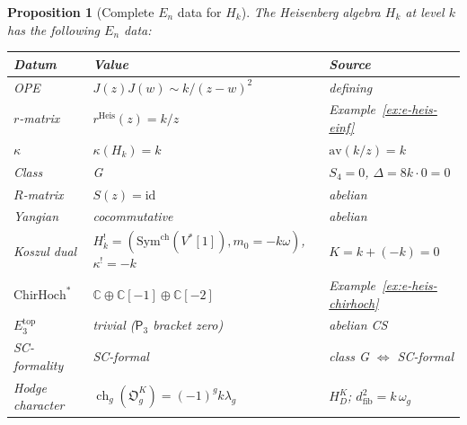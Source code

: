 \documentclass[11pt,reqno]{amsart}
\newtheorem{proposition}[theorem]{Proposition}
\theoremstyle{definition}
\theoremstyle{remark}
\providecommand{\Ethree}{E_3}
\providecommand{\En}{E_n}
\providecommand{\Pthree}{\mathsf{P}_3}
\providecommand{\ChirHoch}{\mathrm{ChirHoch}}
\providecommand{\bC}{\mathbb{C}}
\providecommand{\id}{\mathrm{id}}
\providecommand{\Sym}{\mathrm{Sym}}
\begin{document}
\begin{proposition}[Complete $\En$ data for $H_k$]
\label{prop:e-heis-complete}
The Heisenberg algebra $H_k$ at level $k$ has the following
$\En$ data:
\begin{center}
\renewcommand{\arraystretch}{1.15}
\begin{tabular}{lll}
\textbf{Datum} & \textbf{Value} & \textbf{Source} \\
\hline
\textup{OPE} & $J(z)J(w) \sim k/(z-w)^2$ & defining \\
\textup{$r$-matrix} & $r^{\mathrm{Heis}}(z) = k/z$ &
 Example~\ref{ex:e-heis-einf} \\
\textup{$\kappa$} & $\kappa(H_k) = k$ &
 $\mathrm{av}(k/z) = k$ \\
\textup{Class} & G &
 $S_4 = 0$, $\Delta = 8k \cdot 0 = 0$ \\
\textup{$R$-matrix} & $S(z) = \id$ & abelian \\
\textup{Yangian} & cocommutative & abelian \\
\textup{Koszul dual} & $H_k^!=(\Sym^{\mathrm{ch}}(V^*[1]),m_0=-k\omega)$,
 $\kappa^! = -k$ & $K = k + (-k) = 0$ \\
\textup{$\ChirHoch^*$} & $\bC \oplus \bC[-1] \oplus \bC[-2]$ &
 Example~\ref{ex:e-heis-chirhoch} \\
\textup{$\Ethree^{\mathrm{top}}$} & trivial
 ($\Pthree$ bracket zero) & abelian CS \\
\textup{SC-formality} & SC-formal &
 class G $\Leftrightarrow$ SC-formal \\
\textup{Hodge character} &
 $\operatorname{ch}_g(\mathfrak O_g^K)=(-1)^gk\lambda_g$
 & $H_D^K$; $d_{\mathrm{fib}}^2 = k\,\omega_g$
\end{tabular}
\end{center}
\end{proposition}
\end{document}
